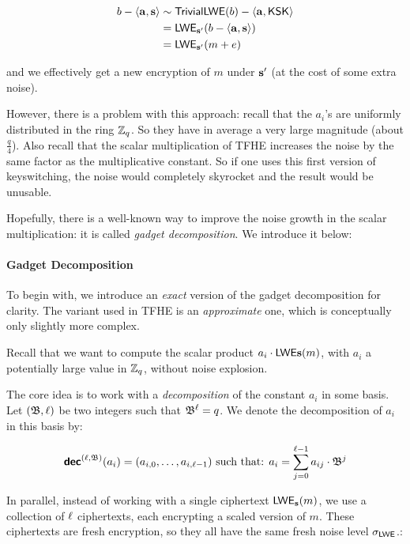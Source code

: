 \begin{align*}
	b - \langle \mathbf a, \mathbf s \rangle &\sim \textsf{TrivialLWE}(b) - \left \langle  \mathbf a, \textsf{KSK} \right \rangle\\
	& = \textsf{LWE}_{\mathbf s'}(b - \langle \mathbf a, \mathbf s \rangle)\\
		 &= \textsf{LWE}_{\mathbf s'}(m + e)
\end{align*}


and we effectively get a new encryption of $m$ under $\mathbf s'$ (at the cost of some extra noise).


However, there is a problem with this approach: recall that the $a_i$'s are uniformly distributed in the ring $\mathbb{Z}_q$. So they have in average a very large magnitude (about $\frac q 4$). Also recall that the scalar multiplication of TFHE increases the noise by the same factor as the multiplicative constant. So if one uses this first version of keyswitching, the noise would completely skyrocket and the result would be unusable.

Hopefully, there is a well-known way to improve the noise growth in the scalar multiplication: it is called \textit{gadget decomposition}. We introduce it below:

\paragraph{Gadget Decomposition}

To begin with, we introduce an \textit{exact} version of the gadget decomposition for clarity. The variant used in TFHE is an \textit{approximate} one, which is conceptually only slightly more complex.


Recall that we want to compute the scalar product $a_i \cdot \textsf{LWE}{\mathbf s}(m)$, with $a_i$ a potentially large value in $\mathbb{Z}_q$, without noise explosion.

The core idea is to work with a \textit{decomposition} of the constant $a_i$ in some basis. Let $(\mathfrak{B}, \ell)$ be two integers such that $\mathfrak{B}^\ell = q$. We denote the decomposition of $a_i$ in this basis by:

\[
	\textbf{\textsf{dec}}^{(\ell, \mathfrak{B})}(a_i) = (a_{i,0}, \dots, a_{i, \ell-1}) \text{ such that: } a_i = \sum_{j=0}^{\ell-1} a_{ij} \cdot \mathfrak{B}^j
\]

In parallel, instead of working with a single ciphertext $\textsf{LWE}_{\mathbf s}(m)$, we use a collection of $\ell$ ciphertexts, each encrypting a scaled version of $m$. These ciphertexts are fresh encryption, so they all have the same fresh noise level $\sigma_{\textsf{LWE}}$.: 

